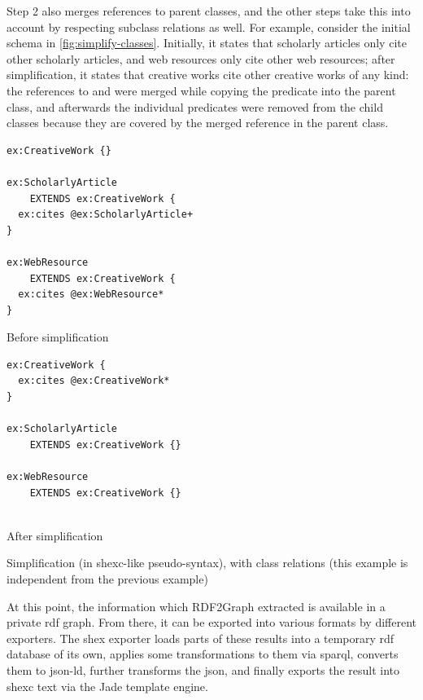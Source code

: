 Step 2 also merges references to parent classes,
and the other steps take this into account by respecting subclass relations as well.
For example, consider the initial \gls{schema} in \cref{fig:simplify-classes}.
Initially, it states that scholarly articles only cite other scholarly articles,
and web resources only cite other web resources;
after simplification, it states that creative works cite other creative works of any kind:
the references to  and 
were merged while copying the  predicate into the  parent class,
and afterwards the individual \glspl{predicate} were removed from the child classes
because they are covered by the merged reference in the parent class.

\begin{listing}[ht]
\begin{sublisting}[t]{0.45\textwidth}
\begin{lstlisting}
ex:CreativeWork {}

ex:ScholarlyArticle
    EXTENDS ex:CreativeWork {
  ex:cites @ex:ScholarlyArticle+
}

ex:WebResource
    EXTENDS ex:CreativeWork {
  ex:cites @ex:WebResource*
}
\end{lstlisting}
\caption{Before simplification}
\label{fig:simplify-classes-before}
\end{sublisting}
\begin{sublisting}[t]{0.45\textwidth}
\begin{lstlisting}[showlines=true]
ex:CreativeWork {
  ex:cites @ex:CreativeWork*
}

ex:ScholarlyArticle
    EXTENDS ex:CreativeWork {}

ex:WebResource
    EXTENDS ex:CreativeWork {}


\end{lstlisting}
\caption{After simplification}
\label{fig:simplify-classes-after}
\end{sublisting}
\caption[Simplification, with class relations]{
  Simplification (in \acrshort{shexc}-like pseudo-syntax), with class relations
  (this example is independent from the previous example)
}
\label{fig:simplify-classes}
\end{listing}

At this point, the information which \gls{RDF2Graph} extracted is available in a private \gls{rdf} graph.
From there, it can be exported into various formats by different exporters.
The \gls{shex} exporter loads parts of these results into a temporary \gls{rdf} database of its own,
applies some transformations to them via \gls{sparql},
converts them to \gls{json-ld},
further transforms the \gls{json},
and finally exports the result into \gls{shexc} text via the Jade template engine.

